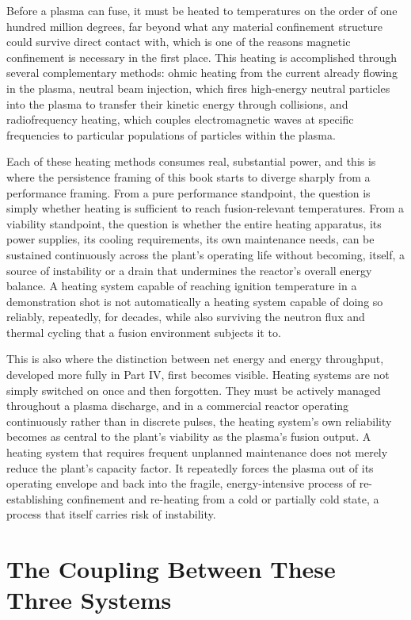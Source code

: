 Before a plasma can fuse, it must be heated to temperatures on the order of one hundred million degrees, far beyond what any material confinement structure could survive direct contact with, which is one of the reasons magnetic confinement is necessary in the first place. This heating is accomplished through several complementary methods: ohmic heating from the current already flowing in the plasma, neutral beam injection, which fires high-energy neutral particles into the plasma to transfer their kinetic energy through collisions, and radiofrequency heating, which couples electromagnetic waves at specific frequencies to particular populations of particles within the plasma.

Each of these heating methods consumes real, substantial power, and this is where the persistence framing of this book starts to diverge sharply from a performance framing. From a pure performance standpoint, the question is simply whether heating is sufficient to reach fusion-relevant temperatures. From a viability standpoint, the question is whether the entire heating apparatus, its power supplies, its cooling requirements, its own maintenance needs, can be sustained continuously across the plant's operating life without becoming, itself, a source of instability or a drain that undermines the reactor's overall energy balance. A heating system capable of reaching ignition temperature in a demonstration shot is not automatically a heating system capable of doing so reliably, repeatedly, for decades, while also surviving the neutron flux and thermal cycling that a fusion environment subjects it to.

This is also where the distinction between net energy and energy throughput, developed more fully in Part IV, first becomes visible. Heating systems are not simply switched on once and then forgotten. They must be actively managed throughout a plasma discharge, and in a commercial reactor operating continuously rather than in discrete pulses, the heating system's own reliability becomes as central to the plant's viability as the plasma's fusion output. A heating system that requires frequent unplanned maintenance does not merely reduce the plant's capacity factor. It repeatedly forces the plasma out of its operating envelope and back into the fragile, energy-intensive process of re-establishing confinement and re-heating from a cold or partially cold state, a process that itself carries risk of instability.

\section{The Coupling Between These Three Systems}

